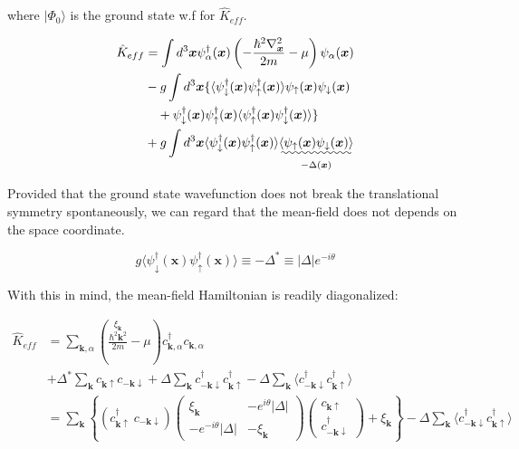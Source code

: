 where $|\Phi_0\rangle$ is the ground state w.f for $\hat{K}_{eff}$. 

\[
\begin{split}
\hat{K}_{eff}&=\int d^3\bm{x}\psi_\alpha^\dagger(\bm{x})\left(-\frac{\hbar^2\nabla_{\bm{x}}^2}{2m}-\mu\right)\psi_\alpha(\bm{x})\\
&-g\int d^3\bm{x}\{\langle\psi_\downarrow^\dagger(\bm{x})\psi_\uparrow^\dagger(\bm{x})\rangle \psi_\uparrow(\bm{x})\psi_\downarrow(\bm{x})\\
&\quad+\psi_\downarrow^\dagger(\bm{x})\psi_\uparrow^\dagger(\bm{x}) \langle\psi_\uparrow^\dagger(\bm{x})\psi_\downarrow^\dagger(\bm{x})\rangle\}\\
&+g\int d^3\bm{x}\langle\psi_\downarrow^\dagger(\bm{x})\psi_\uparrow^\dagger(\bm{x})\rangle \underset{-\Delta(\bm{x})}{\uwave{\langle\psi_\uparrow(\bm{x})\psi_\downarrow(\bm{x})\rangle}}
\end{split}
 \]

Provided that the ground state wavefunction does not break the translational symmetry spontaneously, we can regard that the mean-field does not depends on the space coordinate. 

\[g\langle\psi_\downarrow^\dagger(\bm{x})\psi_\uparrow^\dagger(\bm{x})\rangle \equiv-\Delta^*\equiv|\Delta|e^{-i\theta} \]

With this in mind, the mean-field Hamiltonian is readily diagonalized:

\[\begin{split}
\hat{K}_{eff} &=\sum_{\bm{k}, \alpha}\left(\overset{\xi_{\bm{k}}}{\frac{\hbar^2\bm{k}^2}{2m}}-\mu\right)c_{\bm{k},\alpha}^\dagger c_{\bm{k},\alpha}\\
&+\Delta^* \sum_{\bm{k}} c_{\bm{k}\uparrow}c_{-\bm{k}\downarrow}+ \Delta\sum_{\bm{k}}c_{-\bm{k}\downarrow}^\dagger c_{\bm{k}\uparrow}^\dagger - \Delta\sum_{\bm{k}}\langle c_{-\bm{k}\downarrow}^\dagger c_{\bm{k}\uparrow}^\dagger\rangle\\
&=\sum_{\bm{k}}\left\{(c_{\bm{k}\uparrow}^\dagger\  c_{-\bm{k}\downarrow}) \left(\begin{matrix}
\xi_{\bm{k}} & -e^{i\theta}|\Delta|\\
-e^{-i\theta}|\Delta| & -\xi_{\bm{k}}
\end{matrix}\right)
\left(\begin{matrix}
c_{\bm{k}\uparrow}\\
c_{-\bm{k}\downarrow}^\dagger
\end{matrix}\right)+\xi_{\bm{k}}\right\}-\Delta\sum_{\bm{k}}\langle c_{-\bm{k}\downarrow}^\dagger c_{\bm{k}\uparrow}^\dagger\rangle
\end{split} \]

